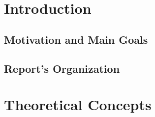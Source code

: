 \documentclass[12pt]{article}
\begin{document}
\renewcommand{\listfigurename}{Figures}
\newpage
\listoffigures

\renewcommand{\listtablename}{Tables}
\listoftables


\lstlistoflistings

\printglossaries


\newpage
{}
\section{Introduction}
\subsection{Motivation and Main Goals}

\subsection{Report's Organization}

\newpage
\section{Theoretical Concepts}



\end{document}
